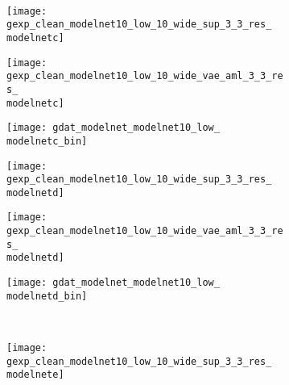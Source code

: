 \begin{figure}[t!]
{\begin{subfigure}[t]{0.07\textwidth}
    \end{subfigure}
    \\[-4px]
    \begin{subfigure}[t]{0.07\textwidth}
        \vspace{0px}\centering
        \texttt{[image: gexp\_clean\_modelnet10\_low\_10\_wide\_sup\_3\_3\_res\_\\modelnetc]}
    \end{subfigure}
    \begin{subfigure}[t]{0.07\textwidth}
        \vspace{0px}\centering
        \texttt{[image: gexp\_clean\_modelnet10\_low\_10\_wide\_vae\_aml\_3\_3\_res\_\\modelnetc]}
    \end{subfigure}
    \begin{subfigure}[t]{0.07\textwidth}
        \vspace{0px}\centering
        \texttt{[image: gdat\_modelnet\_modelnet10\_low\_\\modelnetc\_bin]}
    \end{subfigure}
    \begin{subfigure}[t]{0.07\textwidth}
        \vspace{0px}\centering
        \texttt{[image: gexp\_clean\_modelnet10\_low\_10\_wide\_sup\_3\_3\_res\_\\modelnetd]}
    \end{subfigure}
    \begin{subfigure}[t]{0.07\textwidth}
        \vspace{0px}\centering
        \texttt{[image: gexp\_clean\_modelnet10\_low\_10\_wide\_vae\_aml\_3\_3\_res\_\\modelnetd]}
    \end{subfigure}
    \begin{subfigure}[t]{0.07\textwidth}
        \vspace{0px}\centering
        \texttt{[image: gdat\_modelnet\_modelnet10\_low\_\\modelnetd\_bin]}
    \end{subfigure}
    \\[-4px]
    \begin{subfigure}[t]{0.07\textwidth}
        \vspace{0px}\centering
        \texttt{[image: gexp\_clean\_modelnet10\_low\_10\_wide\_sup\_3\_3\_res\_\\modelnete]}

\end{subfigure}}
\end{figure}
